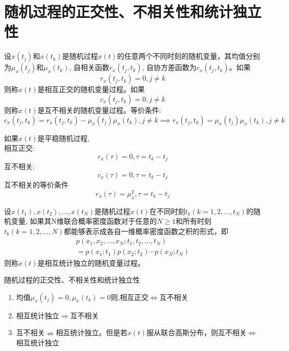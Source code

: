 \section{随机过程的正交性、不相关性和统计独立性}

\begin{frame}
\begin{definition}[]
	设$x(t_j)$和$x(t_k)$是随机过程$x(t)$的任意两个不同时刻的随机变量，其均值分别为$\mu_x(t_j)$和$\mu_x(t_k)$, 自相关函数$r_x(t_j,t_k)$, 自协方差函数为$c_x(t_j,t_k)$。如果
	\[r_x(t_j,t_k)=0,j\ne k \]
	则称$x(t)$是相互正交的随机变量过程。如果
	\[c_x(t_j,t_k)=0,j\ne k \]
	则称$x(t)$是互不相关的随机变量过程。等价条件:
	\[c_x(t_j,t_k)=r_x(t_j,t_k)-\mu_x(t_j)\mu_x(t_k), j\ne k \implies r_x(t_j,t_k)=\mu_x(t_j)\mu_x(t_k),j\ne k \]
\end{definition}
\end{frame}

\begin{frame}
\begin{definition}[]
	如果$x(t)$是平稳随机过程,\\
	相互正交:
	\[r_x(\tau)=0,\tau=t_k-t_j\]
	互不相关:
	\[c_x(\tau)=0,\tau=t_k-t_j\]
	互不相关的等价条件
	\[r_x(\tau)=\mu_x^2,\tau=t_k-t_j\]
\end{definition}
\end{frame}

\begin{frame}
\begin{definition}[]
	设$x(t_1),x(t_2),\dots,x(t_N)$是随机过程$x(t)$在不同时刻$t_k(k=1,2,\dots,t_N)$的随机变量, 如果其N维联合概率密度函数对于任意的$N\ge 1$和所有时刻$t_k(k=1,2,\dots,N)$都能够表示成各自一维概率密度函数之积的形式，即
	\begin{align*}
	p(x_1,x_2,\dots,x_N; t_1,t_2,\dots,t_N)\\
	=p(x_1;t_1)p(x_2;t_2)\cdots p(x_N;t_N)
	\end{align*}
	则称$x(t)$是相互统计独立的随机变量过程。
\end{definition}
\end{frame}

\begin{frame}{随机过程的正交性、不相关性和统计独立性}
\begin{enumerate}
	\item 均值$\mu_x(t_j)=0,\mu_x(t_k)=0$则,相互正交$\Leftrightarrow$互不相关
	\item 相互统计独立$\Rightarrow$互不相关
	\item 互不相关$\nRightarrow$相互统计独立。但是若$x(t)$服从联合高斯分布，则互不相关$\Leftrightarrow$相互统计独立
\end{enumerate}
\end{frame}

